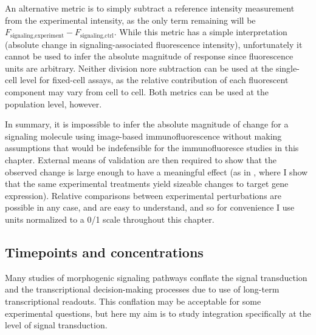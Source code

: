An alternative metric is to simply subtract a reference intensity measurement
from the experimental intensity, as the only term remaining will
be $F_\text{signaling,experiment}-F_\text{signaling,ctrl}$.
While this metric has a simple interpretation (absolute change in
signaling-associated fluorescence intensity), unfortunately it cannot be
used to infer the absolute magnitude
of response since fluorescence units are arbitrary.
Neither division nore subtraction can be used at the
single-cell level for fixed-cell assays,
as the relative contribution of each fluorescent component may vary
from cell to cell. Both metrics can be used
at the population level, however.


In summary, it is impossible to infer the absolute magnitude of change for
a signaling molecule using image-based immunofluorescence without
making assumptions that would be indefensible for the
immunofluoresce studies in this chapter. External
means of validation are then required to show that the observed
change is large enough to have a meaningful effect (as in
, where I show that the same experimental
treatments yield sizeable changes to target gene expression).
Relative comparisons between experimental perturbations are possible in any case,
and are easy to understand,
and so for convenience I use units normalized to a 0/1 scale throughout this chapter.


\subsection{Timepoints and concentrations}


Many studies of morphogenic signaling
pathways conflate the signal transduction and the transcriptional
decision-making processes due to use of long-term transcriptional
readouts. This conflation may be acceptable for some experimental
questions, but here my aim is to study integration specifically at
the level of signal transduction.


